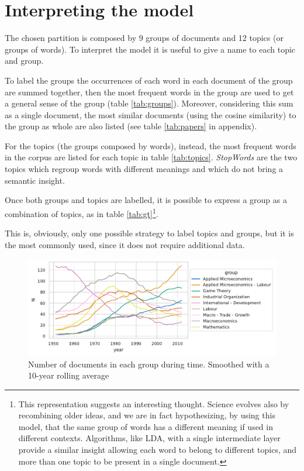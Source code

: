 \documentclass[a4paper, 11pt, headings=standardclasses, tablecaptionsbelow]{scrartcl}
\begin{document}
\section{Interpreting the model}
The chosen partition is composed by 9 groups of documents and 12 topics (or groups of words).
To interpret the model it is useful to give a name to each topic and group.



To label the groups the occurrences of each word in each document of the group are summed together, then the most frequent words in the group are used to get a general sense of the group (table \ref{tab:groups}). Moreover, considering this sum as a single document, the most similar documents (using the cosine similarity) to the group as whole are also listed (see table \ref{tab:papers} in appendix).



For the topics (the groups composed by words), instead, the most frequent words in the corpus are listed for each topic in table \ref{tab:topics}. \textit{StopWords} are the two topics which regroup words with different meanings and which do not bring a semantic insight.



Once both groups and topics are labelled, it is possible to express a group as a combination of topics, as in table \ref{tab:gt}\footnote{This representation suggests an interesting thought. Science evolves also by recombining older ideas, and we are in fact hypothesizing, by using this model, that the same group of words has a different meaning if used in different contexts. Algorithms, like LDA, with a single intermediate layer provide a similar insight allowing each word to belong to different topics, and more than one topic to be present in a single document.}.

This is, obviously, only one possible strategy to label topics and groups, but it is the most commonly used, since it does not require additional data.

\begin{figure}[tb]
  \centering
  \includegraphics[width=\textwidth]{src/groups.pdf}
  \caption[Groups]{Number of documents in each group during time. Smoothed with a 10-year rolling average}
  \label{fig:groups}
\end{figure}
\end{document}
